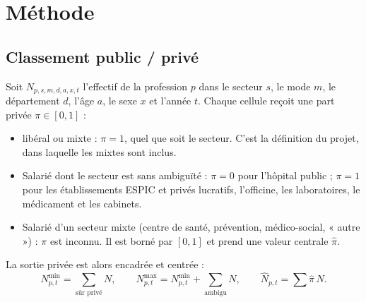 \documentclass[11pt]{article}
\begin{document}
\section{Méthode}
\subsection{Classement public / privé}
Soit $N_{p,s,m,d,a,x,t}$ l'effectif de la profession $p$ dans le secteur $s$, le mode $m$, le département $d$,
l'âge $a$, le sexe $x$ et l'année $t$. Chaque cellule reçoit une part privée $\pi \in [0,1]$ :
\begin{itemize}
  \item libéral ou mixte : $\pi = 1$, quel que soit le secteur. C'est la définition du projet, dans laquelle
  les mixtes sont inclus.
  \item Salarié dont le secteur est sans ambiguïté : $\pi = 0$ pour l'hôpital public ; $\pi = 1$ pour les
  établissements ESPIC et privés lucratifs, l'officine, les laboratoires, le médicament et les cabinets.
  \item Salarié d'un secteur mixte (centre de santé, prévention, médico-social, « autre ») : $\pi$ est inconnu.
  Il est borné par $[0,1]$ et prend une valeur centrale $\hat\pi$.
\end{itemize}
La sortie privée est alors encadrée et centrée :
\begin{equation}
N^{\min}_{p,t} = \sum_{\text{sûr privé}} N, \qquad
N^{\max}_{p,t} = N^{\min}_{p,t} + \sum_{\text{ambigu}} N, \qquad
\hat N_{p,t} = \sum \hat\pi\, N .
\end{equation}
\end{document}
